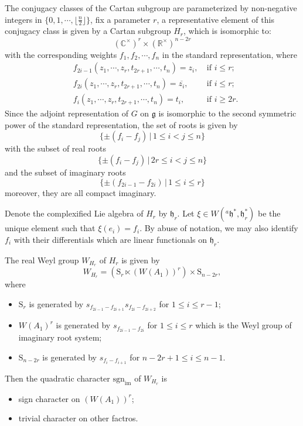 \documentclass[12pt, a4paper]{amsart}
\numberwithin{equation}{section}
\newcommand{\BC}{{\mathbb {C}}}
\newcommand{\BR}{{\mathbb {R}}}
\newcommand{\fg}{\mathfrak{g}}
\newcommand{\fh}{\mathfrak{h}}
\newcommand{\sgn}{{\mathrm{sgn}}}
\newcommand{\set}[2]{\{#1\,|\,#2\}}
\renewcommand{\bar}{\overline}
\begin{document}
The conjugacy classes of the Cartan subgroup are parameterized by non-negative integers in $\{0,1,\cdots,\lfloor \frac{n}{2}\rfloor\}$, fix a parameter $r$, a representative element of this conjugacy class is given by a Cartan subgroup $H_r$, which is isomorphic to:
$$(\BC^{\times})^r \times (\BR^{\times})^{n-2r}$$
with the corresponding weights $f_1,f_2,\cdots ,f_n$ in the standard representation, where
\begin{align}
    &f_{2i-1}(z_1,\cdots,z_r,t_{2r+1},\cdots,t_{n}) = z_i, \ & \textrm{if $i \leq r$};\\
    &f_{2i}(z_1,\cdots,z_r,t_{2r+1},\cdots,t_{n}) = \bar{z_i}, \ & \textrm{if $i \leq r$};\\
    &f_{i}(z_1,\cdots,z_r,t_{2r+1},\cdots,t_{n}) = t_i, \ & \textrm{if $i \geq 2r$}.
\end{align}
Since the adjoint representation of $G$ on $\fg$ is isomorphic to the second symmetric power of the standard representation, the set of roots is given by
$$\set{\pm (f_i - f_j)}{1 \leq i < j \leq n}$$
with the subset of real roots
$$\set{\pm(f_i - f_j)}{2r \leq i < j \leq n}$$
and the subset of imaginary roots
$$\set{\pm(f_{2i-1} - f_{2i})}{1 \leq i \leq r}$$
moreover, they are all compact imaginary. 

Denote the complexified Lie algebra of $H_r$ by $\fh_r$. Let $\xi \in W({^{a}\fh}^*,\fh_r^*)$ be the unique element such that $\xi(e_i) = f_i$. By abuse of notation, we may also identify $f_i$ with their differentials which are linear functionals on $\fh_r$.

The real Weyl group $W_{H_r}$ of $H_r$ is given by
$$W_{H_r} = (\mathrm{S}_r \ltimes  (W(A_1))^r) \times \mathrm{S}_{n-2r},$$
where 
\begin{itemize}
    \item $\mathrm{S}_r$ is generated by $s_{f_{2i-1}-f_{2i+1}}s_{f_{2i}-f_{2i+2}}$ for $1 \leq i \leq r-1$;
    \item $W(A_1)^r$ is generated by $s_{f_{2i-1}-f_{2i}}$ for $1 \leq i \leq r$ which is the Weyl group of imaginary root system;
    \item $\mathrm{S}_{n-2r}$ is generated by $s_{f_{i}-f_{i+1}}$ for $n-2r +1 \leq i \leq n-1$.
\end{itemize}

Then the quadratic character $\sgn_{\mathrm{im}}$ of $W_{H_r}$ is

\begin{itemize}
    \item sign character on $(W(A_1))^r$;
    \item trivial character on other factros.
\end{itemize}
\end{document}
